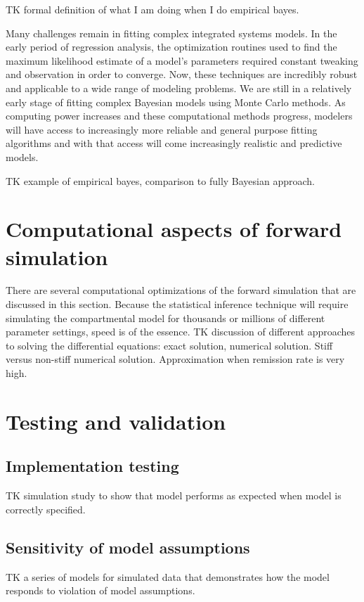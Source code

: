 TK formal definition of what I am doing when I do empirical bayes.

Many challenges remain in fitting complex integrated systems
models. In the early period of regression analysis, the optimization
routines used to find the maximum likelihood estimate of a model's
parameters required constant tweaking and observation in order to
converge. Now, these techniques are incredibly robust and applicable
to a wide range of modeling problems. We are still in a relatively
early stage of fitting complex Bayesian models using Monte Carlo
methods. As computing power increases and these computational methods
progress, modelers will have access to increasingly more reliable and
general purpose fitting algorithms and with that access will come
increasingly realistic and predictive models.

TK example of empirical bayes, comparison to fully Bayesian approach.

\section{Computational aspects of forward simulation}
There are several computational optimizations of the forward
simulation that are discussed in this section.  Because the
statistical inference technique will require simulating the
compartmental model for thousands or millions of different parameter
settings, speed is of the essence.  TK discussion of different
approaches to solving the differential equations: exact solution,
numerical solution. Stiff versus non-stiff numerical
solution. Approximation when remission rate is very high.

\section{Testing and validation}

\subsection{Implementation testing}
TK simulation study to show that model performs as expected when model is
correctly specified.

\subsection{Sensitivity of model assumptions}
TK a series of models for simulated data that demonstrates how the
model responds to violation of model assumptions.

